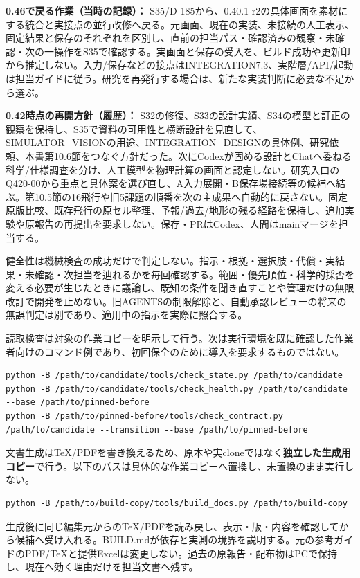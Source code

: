 \documentclass[11pt,a4paper]{article}
\begin{document}
\textbf{0.46で戻る作業（当時の記録）：} S35/D-185から、0.40.1
r2の具体画面を素材にする統合と実接点の並行改修へ戻る。元画面、現在の実装、未接続の人工表示、固定結果と保存のそれぞれを区別し、直前の担当パス・確認済みの観察・未確認・次の一操作をS35で確認する。実画面と保存の受入を、ビルド成功や更新印から推定しない。入力/保存などの接点はINTEGRATION7.3、実階層/API/起動は担当ガイドに従う。研究を再発行する場合は、新たな実装判断に必要な不足から選ぶ。

\textbf{0.42時点の再開方針（履歴）：}
S32の修復、S33の設計実績、S34の模型と訂正の観察を保持し、S35で資料の可用性と横断設計を見直して、SIMULATOR\_VISIONの用途、INTEGRATION\_DESIGNの具体例、研究依頼、本書第10.6節をつなぐ方針だった。次にCodexが固める設計とChatへ委ねる科学/仕様調査を分け、人工模型を物理計算の画面と認定しない。研究入口のQ420-00から重点と具体案を選び直し、A入力展開・B保存場接続等の候補へ結ぶ。第10.5節の16飛行や旧5課題の順番を次の主成果へ自動的に戻さない。固定原版比較、既存飛行の原セル整理、予報/過去/地形の残る経路を保持し、追加実験や原報告の再提出を要求しない。保存・PRはCodex、人間はmainマージを担当する。

健全性は機械検査の成功だけで判定しない。指示・根拠・選択肢・代償・実結果・未確認・次担当を辿れるかを毎回確認する。範囲・優先順位・科学的採否を変える必要が生じたときに議論し、既知の条件を聞き直すことや管理だけの無限改訂で開発を止めない。旧AGENTSの制限解除と、自動承認レビューの将来の無誤判定は別であり、適用中の指示を実際に照合する。

読取検査は対象の作業コピーを明示して行う。次は実行環境を既に確認した作業者向けのコマンド例であり、初回保全のために導入を要求するものではない。

\begin{verbatim}
python -B /path/to/candidate/tools/check_state.py /path/to/candidate
python -B /path/to/candidate/tools/check_health.py /path/to/candidate --base /path/to/pinned-before
python -B /path/to/pinned-before/tools/check_contract.py /path/to/candidate --transition --base /path/to/pinned-before
\end{verbatim}

文書生成はTeX/PDFを書き換えるため、原本や実cloneではなく\textbf{独立した生成用コピー}で行う。以下のパスは具体的な作業コピーへ置換し、未置換のまま実行しない。

\begin{verbatim}
python -B /path/to/build-copy/tools/build_docs.py /path/to/build-copy
\end{verbatim}

生成後に同じ編集元からのTeX/PDFを読み戻し、表示・版・内容を確認してから候補へ受け入れる。BUILD.mdが依存と実測の境界を説明する。元の参考ガイドのPDF/TeXと提供Excelは変更しない。過去の原報告・配布物はPCで保持し、現在へ効く理由だけを担当文書へ残す。
\end{document}
